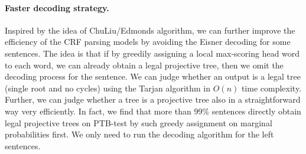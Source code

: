 \documentclass[11pt,a4paper]{article}
\begin{document}
\paragraph{Faster decoding strategy.}
Inspired by the idea of ChuLiu/Edmonds algorithm, we can further improve the efficiency of the CRF parsing models by avoiding the Eisner decoding for some sentences.
The idea is that if by greedily assigning a local max-scoring head word to each word, we can already obtain a legal projective tree, then we omit the decoding process for the sentence.
We can judge whether an output is a legal tree (single root and no cycles) using the Tarjan algorithm in $O(n)$ time complexity.
Further, we can judge whether a tree is a projective tree also in a straightforward way very efficiently.
In fact, we find that more than 99\% sentences directly obtain legal projective trees on PTB-test by such greedy assignment on marginal probabilities first.
We only need to run the decoding algorithm for the left sentences.
\end{document}
